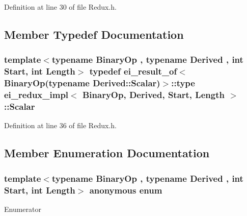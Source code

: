 Definition at line 30 of file Redux.\-h.



\subsection{Member Typedef Documentation}
\hypertarget{structei__redux__impl_a745e28ccec255fb10acd74ce4894bcfb}{
\subsubsection[{Scalar}]{\setlength{\rightskip}{0pt plus 5cm}template$<$typename Binary\-Op , typename Derived , int Start, int Length$>$ typedef {\bf ei\-\_\-result\-\_\-of}$<$Binary\-Op(typename Derived\-::\-Scalar)$>$\-::{\bf type} {\bf ei\-\_\-redux\-\_\-impl}$<$ Binary\-Op, Derived, Start, Length $>$\-::{\bf Scalar}}}\label{structei__redux__impl_a745e28ccec255fb10acd74ce4894bcfb}


Definition at line 36 of file Redux.\-h.



\subsection{Member Enumeration Documentation}
\hypertarget{structei__redux__impl_a07c73b7481e770c461fd353191d5de7c}{\subsubsection[{anonymous enum}]{\setlength{\rightskip}{0pt plus 5cm}template$<$typename Binary\-Op , typename Derived , int Start, int Length$>$ anonymous enum}}\label{structei__redux__impl_a07c73b7481e770c461fd353191d5de7c}
\begin{Desc}
\item[Enumerator]\par
\begin{description}
\item[{\em 
\hypertarget{structei__redux__impl_a07c73b7481e770c461fd353191d5de7caabc44127fa92123825fc549d84fb9aa6}{Half\-Length}\label{structei__redux__impl_a07c73b7481e770c461fd353191d5de7caabc44127fa92123825fc549d84fb9aa6}
}]\end{description}
\end{Desc}


